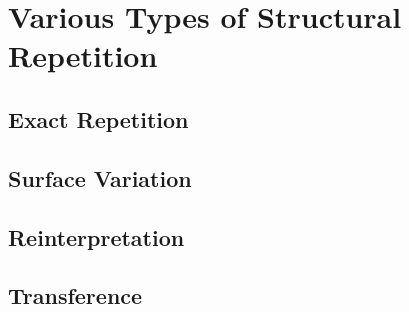 \section{Various Types of Structural Repetition}
        \subsection{Exact Repetition}
        \subsection{Surface Variation}
        \subsection{Reinterpretation}
        \subsection{Transference}